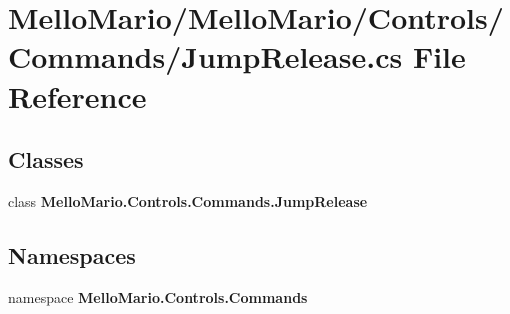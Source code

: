 \section{Mello\+Mario/\+Mello\+Mario/\+Controls/\+Commands/\+Jump\+Release.cs File Reference}
\label{JumpRelease_8cs}
\subsection*{Classes}
\begin{DoxyCompactItemize}
\item 
class \textbf{ Mello\+Mario.\+Controls.\+Commands.\+Jump\+Release}
\end{DoxyCompactItemize}
\subsection*{Namespaces}
\begin{DoxyCompactItemize}
\item 
namespace \textbf{ Mello\+Mario.\+Controls.\+Commands}
\end{DoxyCompactItemize}

